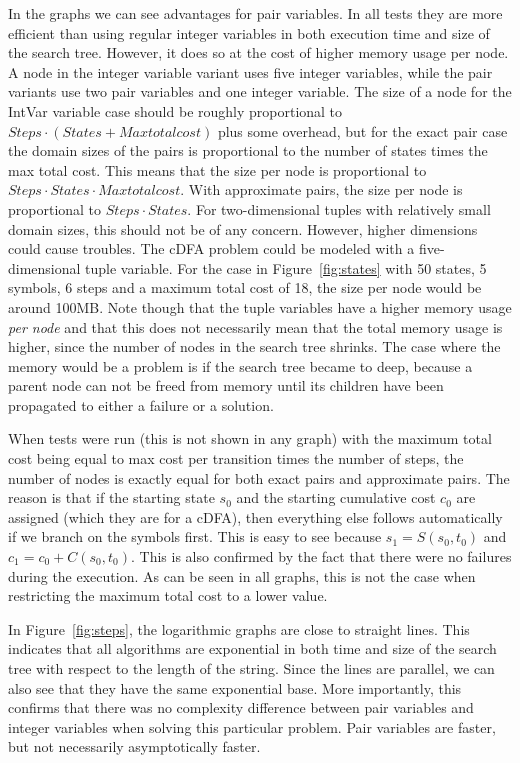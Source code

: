 \documentclass[a4paper,11pt]{article}
\begin{document}





%

In the graphs we can see advantages for pair variables. In all tests they are more efficient than using regular integer variables in both execution time and size of the search tree. However, it does so at the cost of higher memory usage per node. A node in the integer variable variant uses five integer variables, while the pair variants use two pair variables and one integer variable. The size of a node for the IntVar variable case should be roughly proportional to $Steps\cdot (States + Maxtotalcost)$ plus some overhead, but for the exact pair case the domain sizes of the pairs is proportional to the number of states times the max total cost. This means that the size per node is proportional to $Steps\cdot States\cdot Maxtotalcost$. With approximate pairs, the size per node is proportional to $Steps\cdot States$. For two-dimensional tuples with relatively small domain sizes, this should not be of any concern. However, higher dimensions could cause troubles. The cDFA problem could be modeled with a five-dimensional tuple variable. For the case in Figure~\ref{fig:states} with 50 states, 5 symbols, 6 steps and a maximum total cost of 18, the size per node would be around 100MB. Note though that the tuple variables have a higher memory usage \textit{per node} and that this does not necessarily mean that the total memory usage is higher, since the number of nodes in the search tree shrinks. The case where the memory would be a problem is if the search tree became to deep, because a parent node can not be freed from memory until its children have been propagated to either a failure or a solution.

When tests were run (this is not shown in any graph) with the maximum total cost being equal to max cost per transition times the number of steps, the number of nodes is exactly equal for both exact pairs and approximate pairs. The reason is that if the starting state $s_0$ and the starting cumulative cost $c_0$ are assigned (which they are for a cDFA), then everything else follows automatically if we branch on the symbols first. This is easy to see because $s_1=S(s_0, t_0)$ and $c_1=c_0+C(s_0, t_0)$. This is also confirmed by the fact that there were no failures during the execution. As can be seen in all graphs, this is not the case when restricting the maximum total cost to a lower value.

In Figure~\ref{fig:steps}, the logarithmic graphs are close to straight lines. This indicates that all algorithms are exponential in both time and size of the search tree with respect to the length of the string. Since the lines are parallel, we can also see that they have the same exponential base. More importantly, this confirms that there was no complexity difference between pair variables and integer variables when solving this particular problem. Pair variables are faster, but not necessarily asymptotically faster. 
\end{document}
